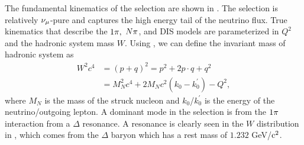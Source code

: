 The fundamental kinematics of the selection are shown in .
The selection is relatively $\nu_{\mu}$-pure and captures the high energy
tail of the neutrino flux. True kinematics that describe the $1\pi,$
$N\pi$, and DIS models are parameterized in $Q^{2}$ and the hadronic
system mass $W$. Using , we can define the
invariant mass of hadronic system as
\begin{equation}
\begin{aligned}W^{2}c^{4} & =\left(p+q\right)^{2}=p^{2}+2p\cdot q+q^{2}\\
 & =M_{N}^{2}c^{4}+2M_{N}c^{2}\left(k_{0}-k_{0}^{\prime}\right)-Q^{2},
\end{aligned}
\label{eq:hadronicsystemmassW}
\end{equation}
where $M_{N}$ is the mass of the struck nucleon and $k_{0}$/$k_{0}^{\prime}$
is the energy of the neutrino/outgoing lepton. A dominant mode in
the selection is from the $1\pi$ interaction from a $\Delta$ resonance.
A resonance is clearly seen in the $W$ distribution in ,
which comes from the $\Delta$ baryon which has a rest mass of $1.232$
GeV/$\text{c}^{2}$.

